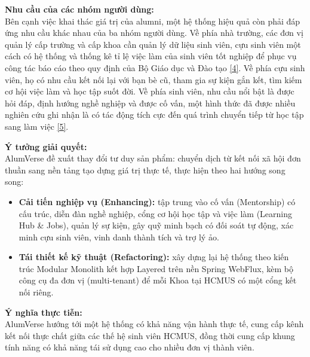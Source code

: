 \documentclass[12pt,a4paper]{article}
\begin{document}
\vspace{-10pt}
\textbf{Nhu cầu của các nhóm người dùng:} \\
Bên cạnh việc khai thác giá trị của alumni, một hệ thống hiệu quả còn phải đáp ứng nhu cầu khác nhau của ba nhóm người dùng. Về phía nhà trường, các đơn vị quản lý cấp trường và cấp khoa cần quản lý dữ liệu sinh viên, cựu sinh viên một cách có hệ thống và thống kê tỉ lệ việc làm của sinh viên tốt nghiệp để phục vụ công tác báo cáo theo quy định của Bộ Giáo dục và Đào tạo \hyperref[ref:moet]{[4]}. Về phía cựu sinh viên, họ có nhu cầu kết nối lại với bạn bè cũ, tham gia sự kiện gắn kết, tìm kiếm cơ hội việc làm và học tập suốt đời. Về phía sinh viên, nhu cầu nổi bật là được hỏi đáp, định hướng nghề nghiệp và được cố vấn, một hình thức đã được nhiều nghiên cứu ghi nhận là có tác động tích cực đến quá trình chuyển tiếp từ học tập sang làm việc \hyperref[ref:nabi]{[5]}.

\textbf{Ý tưởng giải quyết:}\\
AlumVerse đề xuất thay đổi tư duy sản phẩm: chuyển dịch từ kết nối xã hội đơn thuần sang nền tảng tạo dựng giá trị thực tế, thực hiện theo hai hướng song song:
\vspace{-6pt}
\begin{itemize}
    \item \textbf{Cải tiến nghiệp vụ (Enhancing):} tập trung vào cố vấn (Mentorship) có cấu trúc, diễn đàn nghề nghiệp, cổng cơ hội học tập và việc làm (Learning Hub \& Jobs), quản lý sự kiện, gây quỹ minh bạch có đối soát tự động, xác minh cựu sinh viên, vinh danh thành tích và trợ lý ảo.
    \item \textbf{Tái thiết kế kỹ thuật (Refactoring):} xây dựng lại hệ thống theo kiến trúc Modular Monolith kết hợp Layered trên nền Spring WebFlux, kèm bộ công cụ đa đơn vị (multi-tenant) để mỗi Khoa tại HCMUS có một cổng kết nối riêng.
\end{itemize}
\vspace{-4pt}
\textbf{Ý nghĩa thực tiễn:} \\
AlumVerse hướng tới một hệ thống có khả năng vận hành thực tế, cung cấp kênh kết nối thực chất giữa các thế hệ sinh viên HCMUS, đồng thời cung cấp khung tính năng có khả năng tái sử dụng cao cho nhiều đơn vị thành viên.

\end{document}
